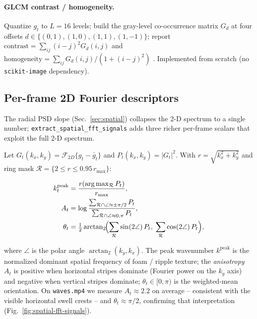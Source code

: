 \documentclass[11pt,a4paper]{article}
\newcommand{\code}[1]{\texttt{\small #1}}
\begin{document}
\paragraph{GLCM contrast / homogeneity.} Quantize $g_t$ to $L=16$ levels;
build the gray-level co-occurrence matrix $G_d$ at four offsets
$d \in \{(0,1),(1,0),(1,1),(1,-1)\}$; report
$\mathrm{contrast} = \sum_{ij}(i-j)^2 G_d(i,j)$ and
$\mathrm{homogeneity} = \sum_{ij} G_d(i,j) / (1 + (i-j)^2)$
\citep{haralick1973}. Implemented from scratch (no \code{scikit-image}
dependency).

\subsection{Per-frame 2D Fourier descriptors}\label{sec:spatial-fft}

The radial PSD slope (Sec.~\ref{sec:spatial}) collapses the 2-D spectrum to
a single number; \code{extract\_spatial\_fft\_signals} adds three richer
per-frame scalars that exploit the full 2-D spectrum.

Let $G_t(k_x,k_y) = \mathcal{F}_{2D}\{g_t - \bar g_t\}$ and
$P_t(k_x,k_y) = |G_t|^2$. With $r = \sqrt{k_x^2+k_y^2}$ and ring mask
$\mathcal{R} = \{2 \le r \le 0.95\, r_{\max}\}$:

\begin{align}
  k^{\text{peak}}_t      &= \frac{r(\arg\max_{\mathcal{R}} P_t)}{r_{\max}}, \\
  A_t                    &= \log \frac{\sum_{\mathcal{R} \cap \angle\approx\pm\pi/2} P_t}
                                       {\sum_{\mathcal{R} \cap \angle\approx 0,\pi} P_t}, \\
  \theta_t               &= \tfrac{1}{2}\arctan_2\!\Bigl(\sum_{\mathcal{R}} \sin(2\angle)\,P_t,\;\sum_{\mathcal{R}} \cos(2\angle)\,P_t\Bigr),
\end{align}

where $\angle$ is the polar angle $\arctan_2(k_y,k_x)$. The peak
wavenumber $k^{\text{peak}}$ is the normalized dominant spatial frequency
of foam / ripple texture; the \emph{anisotropy} $A_t$ is positive when
horizontal stripes dominate (Fourier power on the $k_y$ axis) and
negative when vertical stripes dominate; $\theta_t \in [0,\pi)$ is the
weighted-mean orientation. On \texttt{waves.mp4} we measure
$A_t \approx 2.2$ on average -- consistent with the visible horizontal
swell crests -- and $\theta_t \approx \pi/2$, confirming that interpretation
(Fig.~\ref{fig:spatial-fft-signals}).
\end{document}
